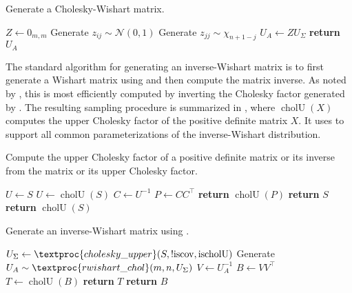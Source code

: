 \documentclass[12pt,a4paper,reqno]{amsart}
\numberwithin{equation}{section}
\newcommand{\cholwishart}[1]{\mathrm{chol}\mathcal{W}_{#1}}
\newcommand{\cholU}{\operatorname{cholU}}
\newcommand{\zeromat}[2]{0_{#1,#2}}
\begin{document}
\begin{algorithm}
    \caption{Generate a Cholesky-Wishart matrix.}\label{alg:rwishartchol}
    \begin{algorithmic}[1]
         \Comment{$\cholwishart{m}(n, U_\Sigma)$}
        \State $Z \gets \zeromat{m}{m}$
        \State Generate $z_{ij} \sim \mathcal{N}(0, 1)$
        \EndFor
        \State Generate $z_{jj} \sim \chi_{n+1-j}$
        \EndFor \Comment{$Z \sim \cholwishart{m}(n, I_m)$}
        \State $U_A \gets Z U_\Sigma$
        \State \textbf{return} $U_A$
        \EndFunction
    \end{algorithmic}
\end{algorithm}

The standard algorithm for generating an inverse-Wishart matrix is to first generate a Wishart matrix using  and then compute the matrix inverse.
As noted by \cite{jones_generating_1985}, this is most efficiently computed by inverting the Cholesky factor generated by .
The resulting sampling procedure is summarized in , where $\cholU(X)$ computes the upper Cholesky factor of the positive definite matrix $X$.
It uses  to support all common parameterizations of the inverse-Wishart distribution.

\begin{algorithm}
    \caption{Compute the upper Cholesky factor of a positive definite matrix or its inverse from the matrix or its upper Cholesky factor.}\label{alg:cholupper}
    \begin{algorithmic}[1]
        \State $U \gets S$
        \Else
        \State $U \gets \cholU(S)$
        \EndIf
        \State $C \gets U^{-1}$
        \State $P \gets C C^\top$
        \State \textbf{return} $\cholU(P)$
        \Else
        \State \textbf{return} $S$
        \Else
        \State \textbf{return} $\cholU(S)$
        \EndIf
        \EndIf
        \EndFunction
    \end{algorithmic}
\end{algorithm}

\begin{algorithm}
    \caption{Generate an inverse-Wishart matrix using .}\label{alg:rinvwishartindirect}
    \begin{algorithmic}[1]
        \State $U_\Sigma \gets \textproc{cholesky\_upper}(S, !\mathrm{iscov}, \mathrm{ischolU})$
        \State Generate $U_A \sim \textproc{rwishart\_chol}(m,n,U_\Sigma)$
        \State $V \gets U_A^{-1}$
        \State $B \gets V V^{\top}$
        \State $T \gets \cholU(B)$
        \State \textbf{return} $T$
        \Else
        \State \textbf{return} $B$
        \EndIf
        \EndFunction
    \end{algorithmic}
\end{algorithm}
\end{document}
